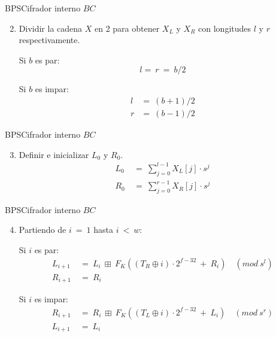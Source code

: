 \begin{frame}{BPS}{Cifrador interno $BC$}

  \begin{enumerate}
    \setcounter{enumi}{1}
    \item Dividir la cadena $X$ en 2 para obtener $X_L$ y $X_R$ con 
      longitudes $l$ y $r$ respectivamente. 
      
      Si $b$ es par: 
      \begin{equation}
        l =\: r\: =\: b/2
      \end{equation}

      Si $b$ es impar:
      \begin{align}
        l &=\: (b+1)/2 \\
        r &=\: (b-1)/2
      \end{align}
  \end{enumerate}
  
\end{frame}

\begin{frame}{BPS}{Cifrador interno $BC$}

  \begin{enumerate}
    \setcounter{enumi}{2}
    \item Definir e inicializar $L_0$ y $R_0$.
      \begin{align}
        L_0\: &=\: \sum_{j=0}^{l-1} X_L[j] \cdot s^j \\
        R_0\: &=\: \sum_{j=0}^{r-1} X_R[j] \cdot s^j
      \end{align}    
  \end{enumerate}
  
\end{frame}

\begin{frame}{BPS}{Cifrador interno $BC$}

  \begin{enumerate}
    \setcounter{enumi}{3}
    \item Partiendo de $i\: =\: 1$ hasta $i\: <\: w$:

      Si $i$ es par:
      \begin{align}
        L_{i+1}\: &=\: L_i\: \boxplus\: 
                      F_K((T_R \oplus i) \cdot 2^{f-32}\: +\: R_i)\quad 
                      (mod\ s^l) \\
        R_{i+1}\: &=\: R_i
      \end{align}
  
      Si $i$ es impar:
      \begin{align}
        R_{i+1}\: &=\: R_i\: \boxplus\: 
                      F_K((T_L \oplus i) \cdot 2^{f-32}\: +\: L_i)\quad 
                      (mod\ s^r) \\
        L_{i+1}\: &=\: L_i
      \end{align}
  \end{enumerate}
  
\end{frame}

